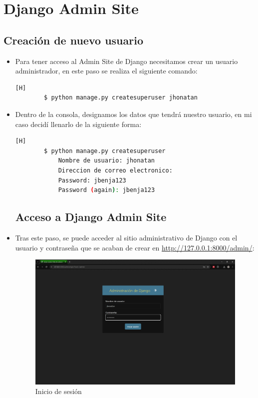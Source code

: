 \documentclass{article}
\begin{document}

    \section{Django Admin Site}
        \subsection{Creación de nuevo usuario}
        \begin{itemize}
            \item Para tener acceso al Admin Site de Django necesitamos crear un usuario administrador, en este paso se realiza el siguiente comando:
            
        \begin{lstlisting}[language=bash,caption={Comando para crear superusuario}][H]
        $ python manage.py createsuperuser jhonatan
        \end{lstlisting}
        
            \item Dentro de la consola, designamos los datos que tendrá nuestro usuario, en mi caso decidí llenarlo de la siguiente forma:
            
        \begin{lstlisting}[language=bash,caption={Creando superusuario}][H]
        $ python manage.py createsuperuser
            Nombre de usuario: jhonatan
            Direccion de correo electronico:
            Password: jbenja123
            Password (again): jbenja123
        \end{lstlisting}

        \subsection{Acceso a Django Admin Site}
            \item Tras este paso, se puede acceder al sitio administrativo de Django con el usuario y contraseña que se acaban de crear en \url{http://127.0.0.1:8000/admin/}:

        \begin{figure}[H]
            \centering
            \includegraphics[width=1\linewidth]{img/Admin_login.png}
            \caption{Inicio de sesión}
            \label{fig:enter-label}
        \end{figure}
        

\end{itemize}
\end{document}
